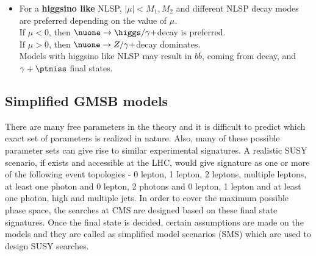 \begin{itemize}
\item For a \textbf{higgsino like} NLSP, $|\mu| < M_1,M_2$ and different NLSP decay modes are preferred depending on the value of $\mu$.\\
If $\mu < 0$, then $\nuone \rightarrow \higgs/\gamma + $\grav decay is preferred.\\
If $\mu > 0$, then $\nuone \rightarrow Z/\gamma + $\grav decay dominates.\\
Models with higgsino like NLSP may result in $b\bar{b}$, coming from \higgs decay, and $\gamma+\ptmiss$ final states.
\end{itemize}

\subsection{Simplified GMSB models}\label{sec:SMSgmsb}
There are many free parameters in the theory and it is difficult to predict which exact set of parameters is realized in nature. Also, 
many of these possible parameter sets can give rise to similar experimental signatures. 
A realistic SUSY scenario, if exists and accessible at the LHC, would give signature as one or more of the following event topologies - 
0 lepton, 1 lepton, 2 leptons, multiple leptons, at least one photon and 0 lepton, 2 photons and 0 lepton, 1 lepton 
and at least one photon, high \ptmiss and multiple jets.
In order to cover the maximum possible phase space, the searches at CMS are designed based on these final state signatures. Once the final state is decided, certain
assumptions are made on the models and they are called as simplified model scenarios (SMS) 
\cite{bib-sms-1,bib-sms-2,bib-sms-3,bib-sms-4,Chatrchyan:2013sza} which are used to design SUSY searches.

